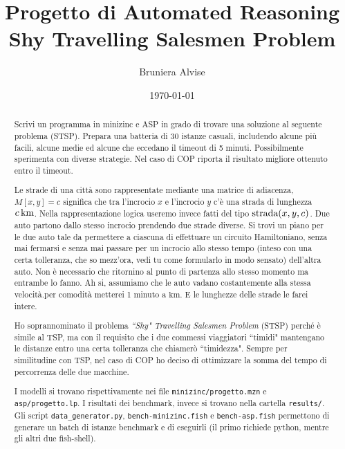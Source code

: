 \documentclass[11pt, a4paper]{article}
\title{Progetto di Automated Reasoning\\Shy Travelling Salesmen Problem}
\author{Bruniera Alvise}
\affil{Università degli studi di Udine}
\date{\today}
\begin{document}
\maketitle

\newpage

\begin{abstract}
    Scrivi un programma in minizinc e ASP in grado di trovare una soluzione al seguente problema (STSP). Prepara una batteria di 30 istanze casuali, includendo alcune più facili, alcune medie ed alcune che eccedano il timeout di 5 minuti.
    Possibilmente sperimenta con diverse strategie. Nel caso di COP riporta il risultato migliore ottenuto entro il timeout.

    Le strade di una città sono rappresentate mediante una matrice di adiacenza, $M[x,y]=c$ significa che tra l'incrocio $x$ e l'incrocio $y$ c'è una strada di lunghezza $\qty[parse-numbers = false]{c}{\kilo\meter}$. Nella rappresentazione logica useremo invece fatti del tipo $\text{\lstinline{strada}}(x,y,c)$. Due auto partono dallo stesso incrocio prendendo due strade diverse. Si trovi un piano per le due auto tale da permettere a ciascuna di effettuare un circuito Hamiltoniano, senza mai fermarsi e senza mai passare per un incrocio allo stesso tempo (inteso con una certa tolleranza, che so mezz'ora, vedi tu come formularlo in modo sensato) dell'altra auto. Non è necessario che ritornino al punto di partenza allo stesso momento ma entrambe lo fanno. Ah si, assumiamo che le auto vadano costantemente alla stessa velocità.per comodità metterei 1 minuto a $\unit{\kilo\meter}$. E le lunghezze delle strade le farei intere.

    Ho soprannominato il problema \emph{``Shy" Travelling Salesmen Problem} (STSP) perché è simile al TSP, ma con il requisito che i due commessi viaggiatori ``timidi" mantengano le distanze entro una certa tolleranza che chiamerò ``timidezza".
    Sempre per similitudine con TSP, nel caso di COP ho deciso di ottimizzare la somma del tempo di percorrenza delle due macchine.

    I modelli si trovano rispettivamente nei file \lstinline{minizinc/progetto.mzn} e \lstinline{asp/progetto.lp}. I risultati dei benchmark, invece si trovano nella cartella \lstinline{results/}.
    Gli script \lstinline{data_generator.py}, \lstinline{bench-minizinc.fish} e \lstinline{bench-asp.fish} permettono di generare un batch di istanze benchmark e di eseguirli (il primo richiede python, mentre gli altri due fish-shell).
\end{abstract}
\end{document}
